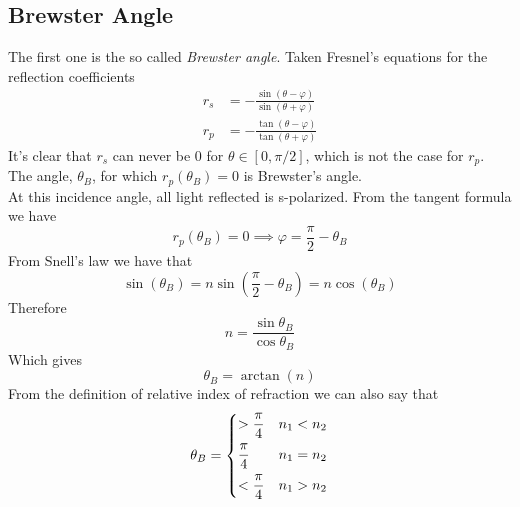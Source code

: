 \documentclass[../electromagnetism.tex]{subfiles}
\begin{document}
\subsection{Brewster Angle}
The first one is the so called \textit{Brewster angle}. Taken Fresnel's equations for the reflection coefficients
\begin{equation*}
	\begin{aligned}
		r_s&= -\frac{\sin(\theta-\varphi)}{\sin(\theta+\varphi)}\\
		r_p&= -\frac{\tan(\theta-\varphi)}{\tan(\theta+\varphi)}
	\end{aligned}
\end{equation*}
It's clear that $r_s$ can never be $0$ for $\theta\in\left[ 0, \pi/2 \right]$, which is not the case for $r_p$. The angle, $\theta_B$, for which $r_p(\theta_B)=0$ is Brewster's angle.\\
At this incidence angle, all light reflected is s-polarized. From the tangent formula we have
\begin{equation*}
	r_p(\theta_B)=0\implies\varphi=\frac{\pi}{2}-\theta_B
\end{equation*}
From Snell's law we have that
\begin{equation*}
	\sin\left(  \theta_B\right)=n\sin\left( \frac{\pi}{2}-\theta_B \right)=n\cos\left( \theta_B \right)
\end{equation*}
Therefore
\begin{equation*}
	n=\frac{\sin\theta_B}{\cos\theta_B}
\end{equation*}
Which gives
\begin{equation}
	\theta_B=\arctan(n)
	\label{eq:brewster.ref}
\end{equation}
From the definition of relative index of refraction we can also say that
\begin{equation}
	\theta_B=\begin{dcases}
		>\frac{\pi}{4} & n_1<n_2\\
		\frac{\pi}{4} & n_1=n_2\\
		<\frac{\pi}{4} & n_1>n_2
	\end{dcases}
	\label{eq:brewster-anal.ref}
\end{equation}
\end{document}
